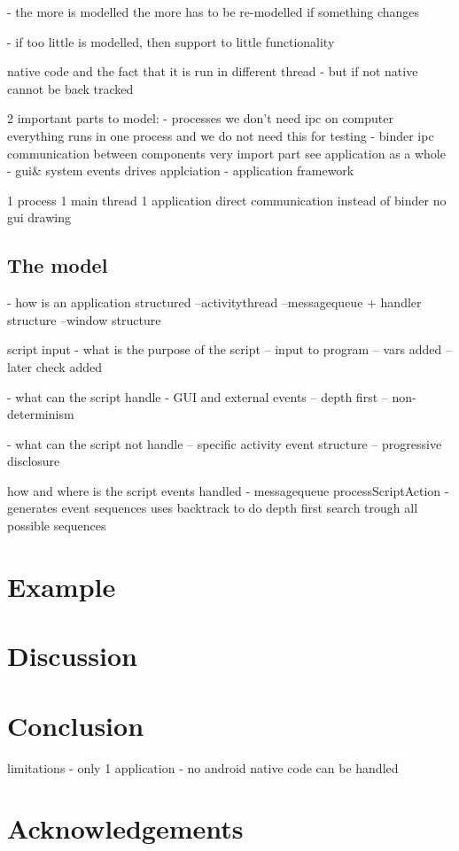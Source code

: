 \documentclass{acm_proc_article-sp}
\begin{document}
   - the more is modelled the more has to be re-modelled if something changes

   - if too little is modelled, then support to little functionality

native code and the fact that it is run in different thread - but if not native cannot be back tracked

2 important parts to model:
- processes we don’t need ipc on computer everything runs in one process and we do not need this for testing
- binder ipc communication between components very import part see application as a whole
- gui\& system events drives applciation
- application framework


1 process
1 main thread
1 application
direct communication instead of binder
no gui drawing

\subsection{The model}
- how is an application structured
--activitythread
--messagequeue + handler structure
--window structure


script input
- what is the purpose of the script
-- input to program
-- vars added
-- later check added

- what can the script handle
- GUI and external events
-- depth first
-- non-determinism

- what can the script not handle
-- specific activity event structure
-- progressive disclosure

how and where is the script events handled
- messagequeue processScriptAction
- generates event sequences uses backtrack to do depth first search trough all possible sequences
\newpage
\section{Example}





\section{Discussion}




\section{Conclusion}


limitations
- only 1 application
- no android native code can be handled



\section{Acknowledgements}

%

% 
\end{document}
